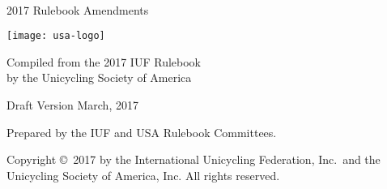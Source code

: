 \begin{titlepage}
\centering
\ \\

{\Huge 2017 Rulebook Amendments}
\vspace{5mm}

\texttt{[image: usa-logo]}

\vspace{5mm}
{\Large Compiled from the 2017 IUF Rulebook\\ }
\vspace{3mm}
{\Large by the Unicycling Society of America}

\vspace{8mm}
{\Large Draft Version \quad March, 2017}

\vspace{40mm}
Prepared by the IUF and USA Rulebook Committees.

\vspace{5mm}
{\small Copyright \copyright\ 2017 by the International Unicycling Federation, Inc.\ and the Unicycling Society of America, Inc. All rights reserved.}

\end{titlepage}
